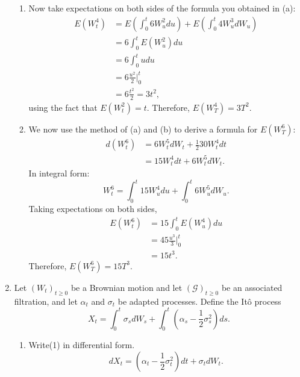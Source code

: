 \documentclass[11pt,a4,table]{article}
\begin{document}
\begin{enumerate}
\begin{enumerate}
        \item Now take expectations on both sides of the formula you obtained in (a):
        \begin{align*}
            E(W_t^4) &= E\left(\int_0^t 6W_u^2 du\right) + E\left(\int_0^t 4W_u^3 dW_u\right)\\
            &= 6\int_0^t E(W_u^2) du\\
            &= 6 \int_0^t u du\\
            &= 6 \frac{u^2}{2}\bigg\vert_0^t\\
            &= 6\frac{t^2}{2}=3t^2,
        \end{align*}
        using the fact that $E(W_t^2)=t$. Therefore, $E(W_T^4)=3T^2$.
        
        \item We now use the method of (a) and (b) to derive a formula for $E(W_T^6)$:
        \begin{align*}
            d(W_t^6) &= 6W_t^5 dW_t + \frac{1}{2}30W_t^4 dt\\
            &= 15W_t^4 dt + 6W_t^5 dW_t.
        \end{align*}
        In integral form:
        \begin{equation*}
            W_t^6=\int_0^t 15W_u^4 du + \int_0^t 6W_u^5 dW_u.
        \end{equation*}
        Taking expectations on both sides,
        \begin{align*}
            E(W_t^6) &= 15\int_0^t E(W_u^4) du\\
            &= 45 \frac{u^3}{3}\bigg\vert^t_0\\
            &= 15t^3.
        \end{align*}
        Therefore, $E(W_T^6)=15T^3$.
    \end{enumerate}
    
    
    \item Let $(W_t)_{t\geq 0}$ be a Brownian motion and let $(\mathcal{G})_{t\geq 0}$ be an associated filtration, and let $\alpha_t$ and $\sigma_t$ be adapted processes. Define the Itô process
    \begin{equation}
        X_t = \int_0^t \sigma_s dW_s + \int_0^t \left(\alpha_s -\frac{1}{2}\sigma_s^2 \right) ds.
    \end{equation}
    
    \begin{enumerate}
        \item Write(1) in differential form.
        \begin{equation*}
            dX_t = \left(\alpha_t -\frac{1}{2}\sigma_t^2\right) dt + \sigma_t dW_t.
        \end{equation*}
    \end{enumerate}
    

\end{enumerate}
\end{document}
